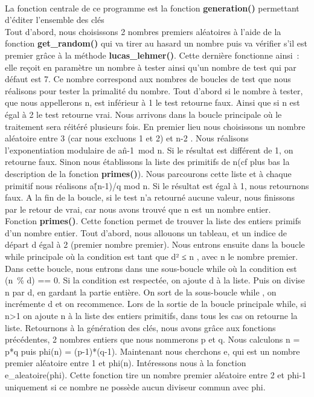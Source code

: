 \documentclass[11pt,fleqn]{book} %
\begin{document}
\paragraph{}La fonction centrale de ce programme est la fonction \textbf{generation()} permettant d'éditer l'ensemble des clés
\\Tout d'abord, nous choisissons 2 nombres premiers aléatoires à l'aide de la fonction \textbf{get\_random()} qui va tirer au hasard un nombre puis va vérifier s'il est premier grâce à la méthode \textbf{lucas\_lehmer()}.
Cette dernière fonctionne ainsi : elle reçoit en paramètre un nombre à tester ainsi qu'un nombre de test qui par défaut est 7. Ce nombre correspond aux nombres de boucles de test que nous réalisons pour tester la primalité du nombre. Tout d'abord si le nombre à tester, que nous appellerons n, est inférieur à 1 le test retourne faux. Ainsi que si n est égal à 2 le test retourne vrai. Nous arrivons dans la boucle principale où le traitement sera réitéré plusieurs fois. En premier lieu nous choisissons un nombre aléatoire entre 3 (car nous excluons 1 et 2) et n-2 . Nous réalisons l’exponentiation modulaire de a\^n-1 mod n. Si le résultat est différent de 1,  on retourne faux. Sinon nous établissons la liste des primitifs de n(cf plus bas la description de la fonction \textbf{primes()}). Nous parcourons cette liste et à chaque primitif nous réalisons a\^(n-1)/q mod n. Si le résultat est égal à 1, nous retournons faux. A la fin de la boucle, si le test n'a retourné aucune valeur, nous finissons par le retour de vrai, car nous avons trouvé que n est un nombre entier.
\\\vspace{0.5cm}Fonction \textbf{primes()}. Cette fonction permet de trouver la liste des entiers primifs d'un nombre entier. Tout d'abord, nous allouons un tableau, et un indice de départ d égal à 2 (premier nombre premier). Nous entrons ensuite dans la boucle while principale où la condition est tant que d² ≤ n , avec n le nombre premier. Dans cette boucle, nous entrons dans une sous-boucle while  où la condition est (n \% d) == 0. Si la condition est respectée, on ajoute d à la liste. Puis on divise n par d, en gardant la partie entière. On sort de la sous-boucle while , on incrémente d et on recommence. Lors de la sortie de la boucle principale while, si n>1 on ajoute n à la liste des entiers primitifs, dans tous les cas on retourne la liste.
\vspace{0.5cm}Retournons à la génération des clés, nous avons grâce aux fonctions précédentes, 2 nombres entiers que nous nommerons p et q. Nous calculons n = p*q puis phi(n) = (p-1)*(q-1). Maintenant nous cherchons e, qui est un nombre premier aléatoire entre 1 et phi(n). Intéressons nous à la fonction e\_aleatoire(phi). Cette fonction tire un nombre premier aléatoire entre 2 et phi-1 uniquement si ce nombre ne possède aucun diviseur commun avec phi.
\end{document}
